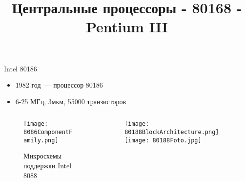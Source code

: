 \documentclass[aspectratio=169,14pt]{beamer}
\title{Центральные процессоры - 80168 - Pentium III}
\begin{document}
\begin{frame}{Intel 80186}
    \begin{itemize}
        \item 1982 год~--- процессор 80186
        \pause
        \item 6-25 МГц, 3мкм, 55000 транзисторов
        \pause
    \end{itemize}
    \begin{columns}[T,onlytextwidth]
        \begin{column}{0.5\textwidth}
            \begin{figure}[htp]
                \centering
                \texttt{[image: 8086ComponentFamily.png]}
                \captionsetup{skip=-5pt}
                \caption{\tiny{Микросхемы поддержки Intel 8088}}
            \end{figure}
        \end{column}
        \begin{column}{0.5\textwidth}
            \begin{figure}[htp]
                \centering
                \texttt{[image: 80188BlockArchitecture.png]}
                \texttt{[image: 80188Foto.jpg]}
            \end{figure}
        \end{column}
    \end{columns}
\end{frame}
\end{document}
